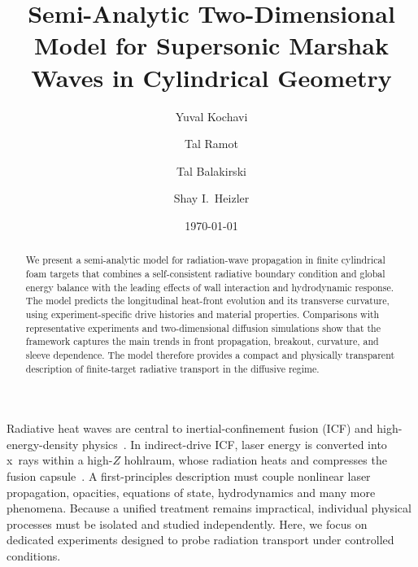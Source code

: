 \documentclass[prl, twocolumn, superscriptaddress, amsmath, amssymb, reprint]{revtex4-2}
\begin{document}
\title{Semi-Analytic Two-Dimensional Model for Supersonic Marshak Waves in Cylindrical Geometry}

\author{Yuval Kochavi}

\author{Tal Ramot}

\author{Tal Balakirski}

\author{Shay I.~Heizler}

\date{\today}

\begin{abstract}
We present a semi-analytic model for radiation-wave propagation in finite cylindrical foam targets that combines a self-consistent radiative boundary condition and global energy balance with the leading effects of wall interaction and hydrodynamic response. The model predicts the longitudinal heat-front evolution and its transverse curvature, using experiment-specific drive histories and material properties. Comparisons with representative experiments and two-dimensional diffusion simulations show that the framework captures the main trends in front propagation, breakout, curvature, and sleeve dependence. The model therefore provides a compact and physically transparent description of finite-target radiative transport in the diffusive regime.
\end{abstract}

\maketitle

\begingroup
\setlength{\parskip}{0pt}
\setlength{\parindent}{1em}
Radiative heat waves are central to inertial-confinement fusion (ICF) and high-energy-density physics~\cite{AbuShawareb2024,AbuShawareb2022}. In indirect-drive ICF, laser energy is converted into x~rays within a high-$Z$ hohlraum, whose radiation heats and compresses the fusion capsule~\cite{Lindl2004}. A first-principles description must couple nonlinear laser propagation, opacities, equations of state, hydrodynamics and many more phenomena. Because a unified treatment remains impractical, individual physical processes must be isolated and studied independently. Here, we focus on dedicated experiments designed to probe radiation transport under controlled conditions.
\end{document}
